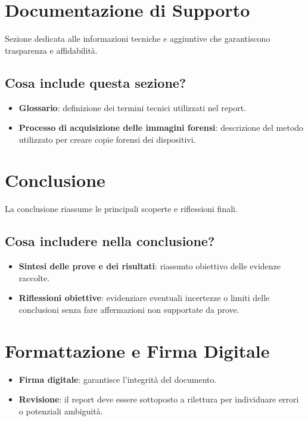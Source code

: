 \documentclass[a4paper,12pt]{report}
\begin{document}
\section{Documentazione di Supporto}
Sezione dedicata alle informazioni tecniche e aggiuntive che garantiscono trasparenza e affidabilità.

\subsection{Cosa include questa sezione?}
\begin{itemize}
    \item \textbf{Glossario}: definizione dei termini tecnici utilizzati nel report.
    \item \textbf{Processo di acquisizione delle immagini forensi}: descrizione del metodo utilizzato per creare copie forensi dei dispositivi.
\end{itemize}

\section{Conclusione}
La conclusione riassume le principali scoperte e riflessioni finali.

\subsection{Cosa includere nella conclusione?}
\begin{itemize}
    \item \textbf{Sintesi delle prove e dei risultati}: riassunto obiettivo delle evidenze raccolte.
    \item \textbf{Riflessioni obiettive}: evidenziare eventuali incertezze o limiti delle conclusioni senza fare affermazioni non supportate da prove.
\end{itemize}

\section{Formattazione e Firma Digitale}
\begin{itemize}
    \item \textbf{Firma digitale}: garantisce l'integrità del documento.
    \item \textbf{Revisione}: il report deve essere sottoposto a rilettura per individuare errori o potenziali ambiguità.
\end{itemize}
\end{document}
